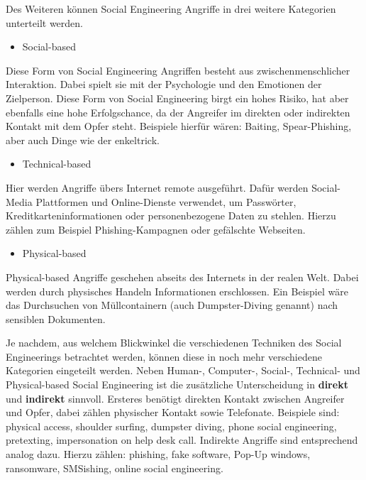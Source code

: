 Des Weiteren können Social Engineering Angriffe in drei weitere Kategorien unterteilt werden.
\begin{itemize}
    \item Social-based
\end{itemize}
Diese Form von Social Engineering Angriffen besteht aus zwischenmenschlicher Interaktion.
Dabei spielt sie mit der Psychologie und den Emotionen der Zielperson.
Diese Form von Social Engineering birgt ein hohes Risiko, hat aber ebenfalls eine hohe Erfolgschance, da der Angreifer im direkten oder indirekten Kontakt mit dem Opfer steht.
Beispiele hierfür wären: Baiting, Spear-Phishing, aber auch Dinge wie der \gls{enkeltrick}.

\begin{itemize}
    \item Technical-based
\end{itemize}
Hier werden Angriffe übers Internet remote ausgeführt.
Dafür werden Social-Media Plattformen und Online-Dienste verwendet, um Passwörter, Kreditkarteninformationen oder personenbezogene Daten zu stehlen.
Hierzu zählen zum Beispiel Phishing-Kampagnen oder gefälschte Webseiten.

\begin{itemize}
    \item Physical-based
\end{itemize}
Physical-based Angriffe geschehen abseits des Internets in der realen Welt.
Dabei werden durch physisches Handeln Informationen erschlossen.
Ein Beispiel wäre das Durchsuchen von Müllcontainern (auch Dumpster-Diving genannt) nach sensiblen Dokumenten.

Je nachdem, aus welchem Blickwinkel die verschiedenen Techniken des Social Engineerings betrachtet werden, können diese in noch mehr verschiedene Kategorien eingeteilt werden.
Neben Human-, Computer-, Social-, Technical- und Physical-based Social Engineering ist die zusätzliche Unterscheidung in \textbf{direkt} und \textbf{indirekt} sinnvoll.
Ersteres benötigt direkten Kontakt zwischen Angreifer und Opfer, dabei zählen physischer Kontakt sowie Telefonate.
Beispiele sind: physical access, shoulder surfing, dumpster diving, phone social engineering, pretexting, impersonation on help desk call.
Indirekte Angriffe sind entsprechend analog dazu.
Hierzu zählen: phishing, fake software, Pop-Up windows, ransomware, SMSishing, online social engineering.

